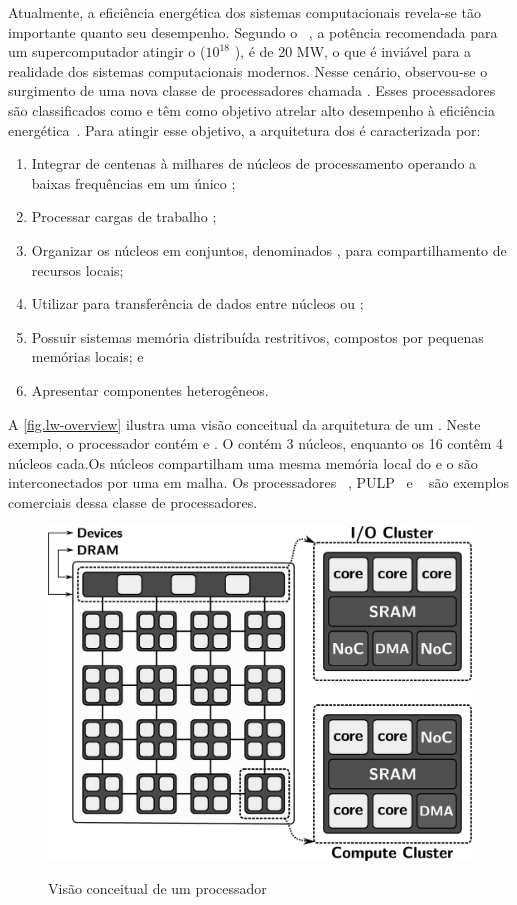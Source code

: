 Atualmente, a eficiência energética dos sistemas computacionais revela-se tão importante quanto seu desempenho. Segundo o \darpa~\cite{darpa:exascale}, a potência recomendada para um supercomputador atingir o \exascale ($10^{18}$ \flops), é de 20 MW, o que é inviável para a realidade dos sistemas computacionais modernos. Nesse cenário, observou-se o surgimento de uma nova classe de processadores chamada \lw. Esses processadores são classificados como \mpsocs e têm como objetivo atrelar alto desempenho à eficiência energética~\cite{francesquini2015}. Para atingir esse objetivo, a arquitetura dos \lws é caracterizada por:
\begin{enumerate}[label=(\roman*)]
    \item Integrar de centenas à milhares de núcleos de processamento operando a baixas frequências em um único \chip;
    \item Processar cargas de trabalho \mimd;
    \item Organizar os núcleos em conjuntos, denominados \clusters, para compartilhamento de recursos locais;
    \item Utilizar \nocs para transferência de dados entre núcleos ou \clusters;
    \item Possuir sistemas memória distribuída restritivos, compostos por pequenas memórias locais; e
    \item Apresentar componentes heterogêneos.
\end{enumerate}
A \autoref{fig.lw-overview} ilustra uma visão conceitual da arquitetura de um \lw. Neste exemplo, o processador contém \ioclusters e \cclusters. O \iocluster contém 3 núcleos, enquanto os 16 \cclusters contêm 4 núcleos cada.Os núcleos compartilham uma mesma memória local do \cluster e o \clusters são interconectados por uma \noc em malha. Os processadores \mppa~\cite{dinechin:2013}, PULP~\cite{pulp} e \taihulight~\cite{fu2016sunway} são exemplos comerciais dessa classe de processadores.

\begin{figure}[t]
	\centering
	\caption{Visão conceitual de um processador \lw}
	\includegraphics[width=0.5\linewidth]{content/images/lw-overview-gs.jpg}
    \label{fig.lw-overview}
\end{figure}

